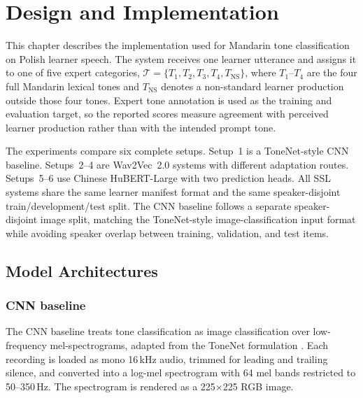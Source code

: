 
\chapter{Design and Implementation}\label{chapter:4_Design}

This chapter describes the implementation used for Mandarin tone classification
on Polish learner speech. The system receives one learner utterance and assigns
it to one of five expert categories,
\(\mathcal{T}=\{T_1,T_2,T_3,T_4,T_{\mathrm{NS}}\}\), where
\(T_1\)--\(T_4\) are the four full Mandarin lexical tones and
\(T_{\mathrm{NS}}\) denotes a non-standard learner production outside those four
tones. Expert tone annotation is used as the training and evaluation target, so
the reported scores measure agreement with perceived learner production rather
than with the intended prompt tone.

The experiments compare six complete setups. Setup~1 is a ToneNet-style CNN
baseline. Setups~2--4 are Wav2Vec~2.0 systems with different adaptation routes.
Setups~5--6 use Chinese HuBERT-Large with two prediction heads. All SSL systems
share the same learner manifest format and the same speaker-disjoint
train/development/test split. The CNN baseline follows a separate
speaker-disjoint image split, matching the ToneNet-style image-classification
input format while avoiding speaker overlap between training, validation, and
test items.

\section{Model Architectures}
\label{sec:design:models}

\subsection{CNN baseline}
\label{sec:design:models:cnn}

The CNN baseline treats tone classification as image classification over
low-frequency mel-spectrograms, adapted from the ToneNet formulation
\cite{gao2019tonenet}. Each recording is loaded as mono 16\,kHz audio, trimmed
for leading and trailing silence, and converted into a log-mel spectrogram with
64 mel bands restricted to 50--350\,Hz. The spectrogram is rendered as a
225\(\times\)225 RGB image.

